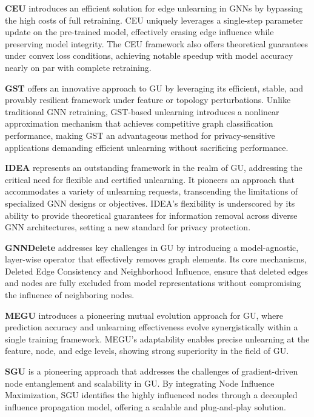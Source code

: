 \textbf{CEU} \cite{2023WuCEU} introduces an efficient solution for edge unlearning in GNNs by bypassing the high costs of full retraining. CEU uniquely leverages a single-step parameter update on the pre-trained model, effectively erasing edge influence while preserving model integrity. The CEU framework also offers theoretical guarantees under convex loss conditions, achieving notable speedup with model accuracy nearly on par with complete retraining.

\textbf{GST} \cite{pan2023gst_unlearning} offers an innovative approach to GU by leveraging its efficient, stable, and provably resilient framework under feature or topology perturbations. Unlike traditional GNN retraining, GST-based unlearning introduces a nonlinear approximation mechanism that achieves competitive graph classification performance, making GST an advantageous method for privacy-sensitive applications demanding efficient unlearning without sacrificing performance.

\textbf{IDEA} \cite{2024IDEA} represents an outstanding framework in the realm of GU, addressing the critical need for flexible and certified unlearning. It pioneers an approach that accommodates a variety of unlearning requests, transcending the limitations of specialized GNN designs or objectives. IDEA's flexibility is underscored by its ability to provide theoretical guarantees for information removal across diverse GNN architectures, setting a new standard for privacy protection.

\textbf{GNNDelete} \cite{cheng2023gnndelete} addresses key challenges in GU by introducing a model-agnostic, layer-wise operator that effectively removes graph elements. Its core mechanisms, Deleted Edge Consistency and Neighborhood Influence, ensure that deleted edges and nodes are fully excluded from model representations without compromising the influence of neighboring nodes.

\textbf{MEGU} \cite{xkliMEGU2024} introduces a pioneering mutual evolution approach for GU, where prediction accuracy and unlearning effectiveness evolve synergistically within a single training framework. MEGU’s adaptability enables precise unlearning at the feature, node, and edge levels, showing strong superiority in the field of GU.

\textbf{SGU} \cite{} is a pioneering approach that addresses the challenges of gradient-driven node entanglement and scalability in GU. By integrating Node Influence Maximization, SGU identifies the highly influenced nodes through a decoupled influence propagation model, offering a scalable and plug-and-play solution.

